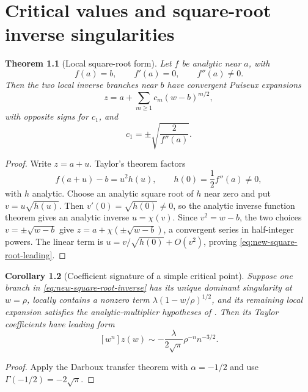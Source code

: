 \documentclass[11pt,a4paper,oneside,openany]{book}
\newtheorem{theorem}{Theorem}[chapter]
\newtheorem{corollary}[theorem]{Corollary}
\theoremstyle{definition}
\theoremstyle{remark}
\begin{document}
\chapter{Critical values and square-root inverse singularities}
\label{ch:inverse-singularities}

\begin{theorem}[Local square-root form]\label{thm:new-square-root-inverse}
Let $f$ be analytic near $a$, with
\[
 f(a)=b,\qquad f'(a)=0,\qquad f''(a)\ne0.
\]
Then the two local inverse branches near $b$ have convergent Puiseux expansions
\begin{equation}\label{eq:new-square-root-inverse}
 z=a+\sum_{m\ge1}c_m(w-b)^{m/2},
\end{equation}
with opposite signs for $c_1$, and
\begin{equation}\label{eq:new-square-root-leading}
 c_1=\pm\sqrt{\frac{2}{f''(a)}}.
\end{equation}
\end{theorem}

\begin{proof}
Write $z=a+u$.  Taylor's theorem factors
\[
 f(a+u)-b=u^2h(u),\qquad h(0)=\frac12f''(a)\ne0,
\]
with $h$ analytic.  Choose an analytic square root of $h$ near zero and put
$v=u\sqrt{h(u)}$.  Then $v'(0)=\sqrt{h(0)}\ne0$, so the analytic inverse
function theorem gives an analytic inverse $u=\chi(v)$.  Since
$v^2=w-b$, the two choices $v=\pm\sqrt{w-b}$ give
$z=a+\chi(\pm\sqrt{w-b})$, a convergent series in half-integer powers.
The linear term is $u=v/\sqrt{h(0)}+O(v^2)$, proving
\eqref{eq:new-square-root-leading}.
\end{proof}

\begin{corollary}[Coefficient signature of a simple critical point]
\label{cor:new-square-root-coefficients}
Suppose one branch in \eqref{eq:new-square-root-inverse} has its unique
dominant singularity at $w=\rho$, locally contains a nonzero term
$\lambda(1-w/\rho)^{1/2}$, and its remaining local expansion satisfies the
analytic-multiplier hypotheses of .  Then its
Taylor coefficients have leading form
\begin{equation}\label{eq:new-square-root-coefficients}
 [w^n]z(w)\sim-\frac{\lambda}{2\sqrt\pi}\rho^{-n}n^{-3/2}.
\end{equation}
\end{corollary}

\begin{proof}
Apply the Darboux transfer theorem with $\alpha=-1/2$ and use
$\Gamma(-1/2)=-2\sqrt\pi$.
\end{proof}
\end{document}
